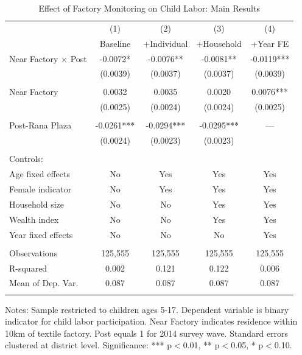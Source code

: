 \begin{table}[H]
\centering
\caption{Effect of Factory Monitoring on Child Labor: Main Results}
\label{tab:main_results_updated}
\begin{threeparttable}
\begin{tabular}{lcccc}
\toprule
& (1) & (2) & (3) & (4) \\
& Baseline & +Individual & +Household & +Year FE \\
\midrule
Near Factory $\times$ Post & -0.0072* & -0.0076** & -0.0081** & -0.0119*** \\
& (0.0039) & (0.0037) & (0.0037) & (0.0039) \\
& & & & \\
Near Factory & 0.0032 & 0.0035 & 0.0020 & 0.0076*** \\
& (0.0025) & (0.0024) & (0.0024) & (0.0025) \\
& & & & \\
Post-Rana Plaza & -0.0261*** & -0.0294*** & -0.0295*** & --- \\
& (0.0024) & (0.0023) & (0.0023) & \\
\\
\midrule
Controls: & & & & \\
\quad Age fixed effects & No & Yes & Yes & Yes \\
\quad Female indicator & No & Yes & Yes & Yes \\
\quad Household size & No & No & Yes & Yes \\
\quad Wealth index & No & No & Yes & Yes \\
\quad Year fixed effects & No & No & No & Yes \\
\\
\midrule
Observations & 125,555 & 125,555 & 125,555 & 125,555 \\
R-squared & 0.002 & 0.121 & 0.122 & 0.006 \\
Mean of Dep. Var. & 0.087 & 0.087 & 0.087 & 0.087 \\
\\
\bottomrule
\end{tabular}
\begin{tablenotes}
\footnotesize
\item Notes: Sample restricted to children ages 5-17. Dependent variable is binary indicator for child labor participation. Near Factory indicates residence within 10km of textile factory. Post equals 1 for 2014 survey wave. Standard errors clustered at district level. Significance: *** p$<$0.01, ** p$<$0.05, * p$<$0.10.
\end{tablenotes}
\end{threeparttable}
\end{table}

